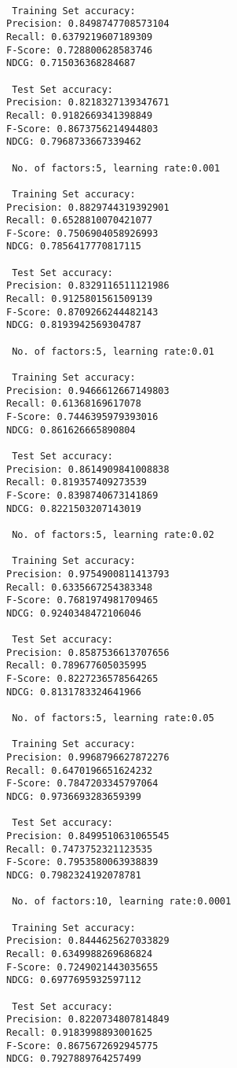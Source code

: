 \documentclass[11pt]{article}
\begin{document}
    \begin{Verbatim}[commandchars=\\\{\}]

 Training Set accuracy:
Precision: 0.8498747708573104
Recall: 0.6379219607189309
F-Score: 0.728800628583746
NDCG: 0.715036368284687

 Test Set accuracy:
Precision: 0.8218327139347671
Recall: 0.9182669341398849
F-Score: 0.8673756214944803
NDCG: 0.7968733667339462

 No. of factors:5, learning rate:0.001

 Training Set accuracy:
Precision: 0.8829744319392901
Recall: 0.6528810070421077
F-Score: 0.7506904058926993
NDCG: 0.7856417770817115

 Test Set accuracy:
Precision: 0.8329116511121986
Recall: 0.9125801561509139
F-Score: 0.8709266244482143
NDCG: 0.8193942569304787

 No. of factors:5, learning rate:0.01

 Training Set accuracy:
Precision: 0.9466612667149803
Recall: 0.61368169617078
F-Score: 0.7446395979393016
NDCG: 0.861626665890804

 Test Set accuracy:
Precision: 0.8614909841008838
Recall: 0.819357409273539
F-Score: 0.8398740673141869
NDCG: 0.8221503207143019

 No. of factors:5, learning rate:0.02

 Training Set accuracy:
Precision: 0.9754900811413793
Recall: 0.6335667254383348
F-Score: 0.7681974981709465
NDCG: 0.9240348472106046

 Test Set accuracy:
Precision: 0.8587536613707656
Recall: 0.789677605035995
F-Score: 0.8227236578564265
NDCG: 0.8131783324641966

 No. of factors:5, learning rate:0.05

 Training Set accuracy:
Precision: 0.9968796627872276
Recall: 0.6470196651624232
F-Score: 0.7847203345797064
NDCG: 0.9736693283659399

 Test Set accuracy:
Precision: 0.8499510631065545
Recall: 0.7473752321123535
F-Score: 0.7953580063938839
NDCG: 0.7982324192078781

 No. of factors:10, learning rate:0.0001

 Training Set accuracy:
Precision: 0.8444625627033829
Recall: 0.6349988269686824
F-Score: 0.7249021443035655
NDCG: 0.6977695932597112

 Test Set accuracy:
Precision: 0.8220734807814849
Recall: 0.9183998893001625
F-Score: 0.8675672692945775
NDCG: 0.7927889764257499


\end{Verbatim}
\end{document}
